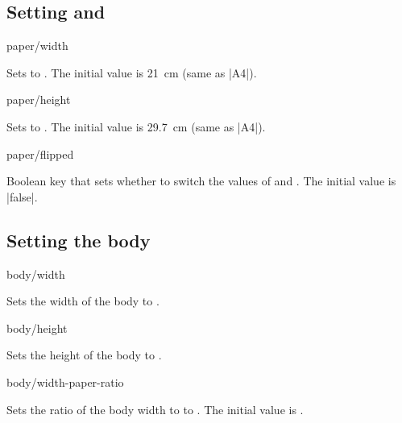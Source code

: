 \documentclass{beerydoc}
\begin{document}
\subsection{Setting  and }
\label{subsec:paper}

\begin{code}{paper/width}
  \begin{syntax}
  \end{syntax}
  Sets  to .
  The initial value is \qty{21}{cm} (same as |A4|).
\end{code}

\begin{code}{paper/height}
  \begin{syntax}
  \end{syntax}
  Sets  to .
  The initial value is \qty{29.7}{cm} (same as |A4|).
\end{code}

\begin{code}{paper/flipped}
  \begin{syntax}
  \end{syntax}
  Boolean key that sets whether to switch the values of  and
  .
  The initial value is |false|.
\end{code}

\subsection{Setting the body}
\label{subsec:body}

\begin{code}{body/width}
  \begin{syntax}
  \end{syntax}
  Sets the width of the body to .
\end{code}

\begin{code}{body/height}
  \begin{syntax}
  \end{syntax}
  Sets the height of the body to .
\end{code}

\begin{code}{body/width-paper-ratio}
  \begin{syntax}
  \end{syntax}
  Sets the ratio of the body width to  to .
  The initial value is .
\end{code}
\end{document}
